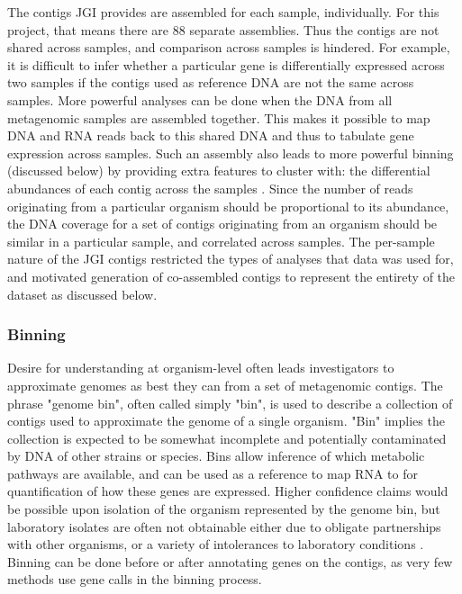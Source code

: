 The contigs JGI provides are assembled for each sample, individually.
For this project, that means there are 88 separate assemblies.
Thus the contigs are not shared across samples, and comparison across samples is hindered.
For example, it is difficult to infer whether a particular gene is differentially expressed across two samples if the contigs used as reference DNA are not the same across samples.
More powerful analyses can be done when the DNA from all metagenomic samples are assembled together.
This makes it possible to map DNA and RNA reads back to this shared DNA and thus to tabulate gene expression across samples.
Such an assembly also leads to more powerful binning (discussed below) by providing extra features to cluster with: the differential abundances of each contig across the samples \cite{albertsen2013}.
Since the number of reads originating from a particular organism should be proportional to its abundance, the DNA coverage for a set of contigs originating from an organism should be similar in a particular sample, and correlated across samples.
The per-sample nature of the JGI contigs restricted the types of analyses that data was used for, and motivated generation of co-assembled contigs to represent the entirety of the dataset as discussed below.

\subsubsection{Binning}
Desire for understanding at organism-level often leads investigators to approximate genomes as best they can from a set of metagenomic contigs.
The phrase "genome bin", often called simply "bin", is used to describe a collection of contigs used to approximate the genome of a single organism.
"Bin" implies the collection is expected to be somewhat incomplete and potentially contaminated by DNA of other strains or species.
Bins allow inference of which metabolic pathways are available, and can be used as a reference to map RNA to for quantification of how these genes are expressed.
Higher confidence claims would be possible upon isolation of the organism represented by the genome bin, but laboratory isolates are often not obtainable either due to obligate partnerships with other organisms, or a variety of intolerances to laboratory conditions \cite{stewart2012}.
Binning can be done before or after annotating genes on the contigs, as very few methods use gene calls in the binning process.

